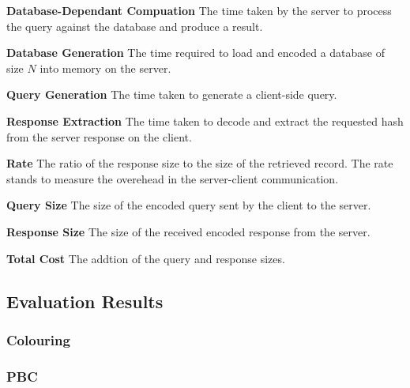 \itemize
\item \textbf{Database-Dependant Compuation} The time taken by the server to
process the query against the database and produce a result.
\item \textbf{Database Generation} The time required to load and encoded a database of
size $N$ into memory on the server.
\item \textbf{Query Generation} The time taken to generate a client-side query.
\item \textbf{Response Extraction} The time taken to decode and extract the requested hash
from the server response on the client.
\item \textbf{Rate} The ratio of the response size to the size of the retrieved record.
The rate stands to measure the overehead in the server-client communication.
\item \textbf{Query Size} The size of the encoded query sent by the client to the server.
\item \textbf{Response Size} The size of the received encoded response from the server.
\item \textbf{Total Cost} The addtion of the query and response sizes.

\subsection{Evaluation Results}

\subsubsection{Colouring}


\newpage

\newpage

\newpage

\newpage

\newpage

\newpage

\newpage

\newpage

\subsubsection{PBC}


\newpage

\newpage

\newpage

\newpage

\newpage

\newpage

\newpage

\newpage

